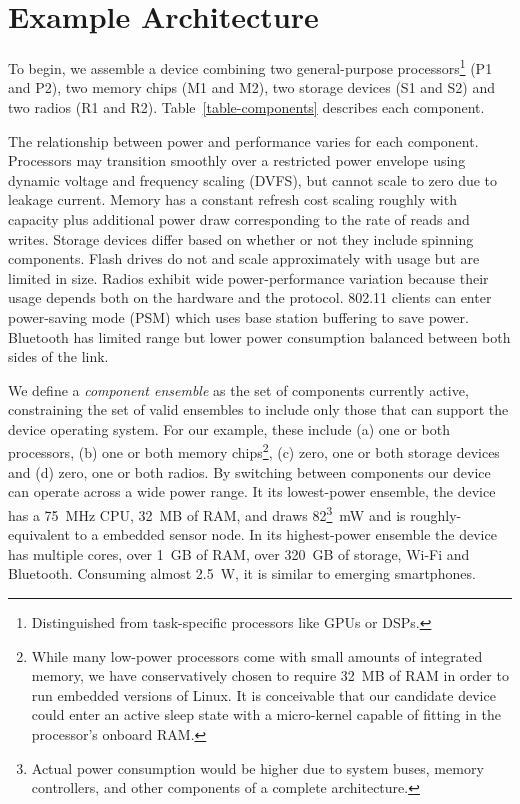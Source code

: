 \vspace*{-0.1in}
\section{Example Architecture}
\label{section-architecture}



To begin, we assemble a device combining two general-purpose
processors\footnote{Distinguished from task-specific processors like GPUs or
DSPs.} (P1 and P2), two memory chips (M1 and M2), two storage devices (S1 and
S2) and two radios (R1 and R2). Table~\ref{table-components} describes each
component.

The relationship between power and performance varies for each component.
Processors may transition smoothly over a restricted power envelope using
dynamic voltage and frequency scaling (DVFS), but cannot scale to zero due to
leakage current. Memory has a constant refresh cost scaling roughly with
capacity plus additional power draw corresponding to the rate of reads and
writes. Storage devices differ based on whether or not they include spinning
components. Flash drives do not and scale approximately with usage but are
limited in size. Radios exhibit wide power-performance variation because
their usage depends both on the hardware and the protocol. 802.11 clients can
enter power-saving mode (PSM) which uses base station buffering to save
power. Bluetooth has limited range but lower power consumption balanced
between both sides of the link.

We define a \textit{component ensemble} as the set of components currently
active, constraining the set of valid ensembles to include only those that
can support the device operating system. For our example, these include (a)
one or both processors, (b) one or both memory chips\footnote{While many
low-power processors come with small amounts of integrated memory, we have
conservatively chosen to require 32~MB of RAM in order to run embedded
versions of Linux. It is conceivable that our candidate device could enter an
active sleep state with a micro-kernel capable of fitting in the processor's
onboard RAM.}, (c) zero, one or both storage devices and (d) zero, one or
both radios. By switching between components our device can operate across a
wide power range. It its lowest-power ensemble, the device has a 75~MHz CPU,
32~MB of RAM, and draws 82\footnote{Actual power consumption would be higher
due to system buses, memory controllers, and other components of a complete
architecture.}~mW and is roughly-equivalent to a embedded sensor node. In its
highest-power ensemble the device has multiple cores, over 1~GB of RAM, over
320~GB of storage, Wi-Fi and Bluetooth. Consuming almost 2.5~W, it is similar
to emerging smartphones.

